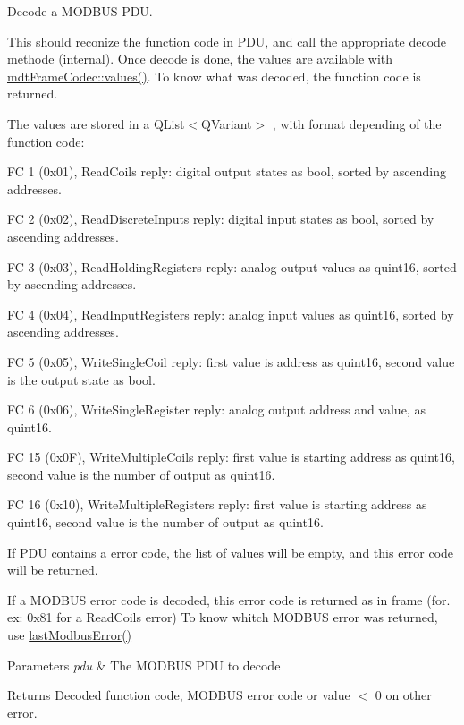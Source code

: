 Decode a MODBUS PDU. 

This should reconize the function code in PDU, and call the appropriate decode methode (internal). Once decode is done, the values are available with \hyperlink{classmdt_frame_codec_a2c0cc0f9d9b72ef2295b7ec7eca72ea7}{mdtFrameCodec::values()}. To know what was decoded, the function code is returned.

The values are stored in a QList$<$QVariant$>$ , with format depending of the function code:
\begin{DoxyItemize}
\item FC 1 (0x01), ReadCoils reply: digital output states as bool, sorted by ascending addresses.
\item FC 2 (0x02), ReadDiscreteInputs reply: digital input states as bool, sorted by ascending addresses.
\item FC 3 (0x03), ReadHoldingRegisters reply: analog output values as quint16, sorted by ascending addresses.
\item FC 4 (0x04), ReadInputRegisters reply: analog input values as quint16, sorted by ascending addresses.
\item FC 5 (0x05), WriteSingleCoil reply: first value is address as quint16, second value is the output state as bool.
\item FC 6 (0x06), WriteSingleRegister reply: analog output address and value, as quint16.
\item FC 15 (0x0F), WriteMultipleCoils reply: first value is starting address as quint16, second value is the number of output as quint16.
\item FC 16 (0x10), WriteMultipleRegisters reply: first value is starting address as quint16, second value is the number of output as quint16.
\end{DoxyItemize}

If PDU contains a error code, the list of values will be empty, and this error code will be returned.

If a MODBUS error code is decoded, this error code is returned as in frame (for. ex: 0x81 for a ReadCoils error) To know whitch MODBUS error was returned, use \hyperlink{classmdt_frame_codec_modbus_a21f3102e12f1a1d9c4145c1ce1f8e6b6}{lastModbusError()}


\begin{DoxyParams}{Parameters}
{\em pdu} & The MODBUS PDU to decode \\
\hline
\end{DoxyParams}
\begin{DoxyReturn}{Returns}
Decoded function code, MODBUS error code or value $<$ 0 on other error. 
\end{DoxyReturn}


